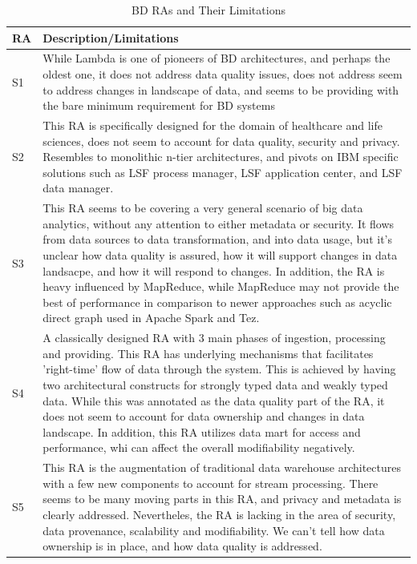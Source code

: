 \documentclass{ieeeaccess}
\begin{document}
\begin{table}
    \caption{BD RAs and Their Limitations}
    \renewcommand*{\arraystretch}{1.4}
    \label{table:BD-RAs-Limitations}
    \begin{tabular}{|p{0.3cm}|p{16.8cm}|}
        \hline
        RA & Description/Limitations \\ 
        \hline
        S1 & While Lambda is one of pioneers of BD architectures, and perhaps the oldest one, it does not address data quality issues, does not address seem to address changes in landscape of data, and seems to be providing with the bare minimum requirement for BD systems  \\
        \hline
        S2 & This RA is specifically designed for the domain of healthcare and life sciences, does not seem to account for data quality, security and privacy. Resembles to monolithic n-tier architectures, and pivots on IBM specific solutions such as LSF process manager, LSF application center, and LSF data manager. \\
        \hline
        S3 & This RA seems to be covering a very general scenario of big data analytics, without any attention to either metadata or security. It flows from data sources to data transformation, and into data usage, but it's unclear how data quality is assured, how it will support changes in data landsacpe, and how it will respond to changes. In addition, the RA is heavy influenced by MapReduce, while MapReduce may not provide the best of performance in comparison to newer approaches such as acyclic direct graph used in Apache Spark and Tez.  \\
        \hline
        S4 & A classically designed RA with 3 main phases of ingestion, processing and providing. This RA has underlying mechanisms that facilitates 'right-time' flow of data through the system. This is achieved by having two architectural constructs for strongly typed data and weakly typed data. While this was annotated as the data quality part of the RA, it does not seem to account for data ownership and changes in data landscape. In addition, this RA utilizes data mart for access and performance, whi can affect the overall modifiability negatively.   \\
        \hline
        S5 & This RA is the augmentation of traditional data warehouse architectures with a few new components to account for stream processing. There seems to be many moving parts in this RA, and privacy and metadata is clearly addressed. Nevertheles, the RA is lacking in the area of security, data provenance, scalability and modifiability. We can't tell how data ownership is in place, and how data quality is addressed. \\

\end{tabular}
\end{table}
\end{document}

